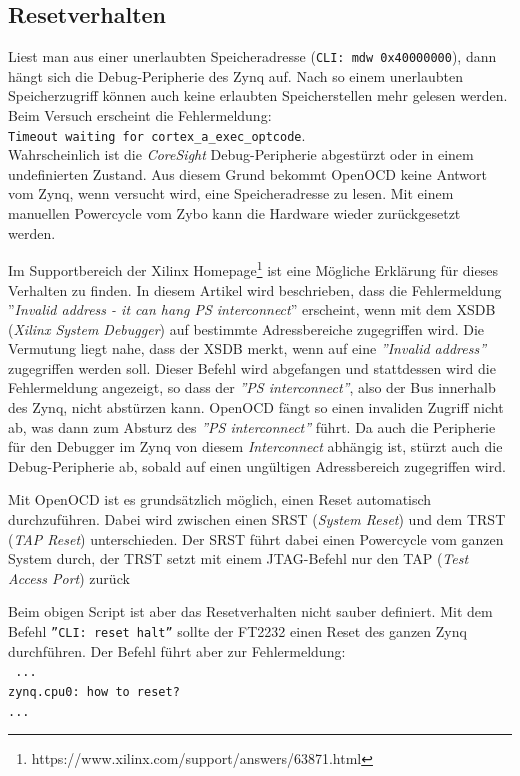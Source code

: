 \subsection{Resetverhalten}
Liest man aus einer unerlaubten Speicheradresse (\texttt{CLI: mdw 0x40000000}), dann hängt sich die Debug-Peripherie des Zynq auf.
Nach so einem unerlaubten Speicherzugriff können auch keine erlaubten Speicherstellen mehr gelesen werden.
Beim Versuch erscheint die Fehlermeldung:\\
\texttt{Timeout waiting for cortex\_a\_exec\_optcode}.\\
Wahrscheinlich ist die \textit{CoreSight} Debug-Peripherie abgestürzt oder in einem undefinierten Zustand.
Aus diesem Grund bekommt OpenOCD keine Antwort vom Zynq, wenn versucht wird, eine Speicheradresse zu lesen.
Mit einem manuellen Powercycle vom Zybo kann die Hardware wieder zurückgesetzt werden.

Im Supportbereich der Xilinx Homepage\footnote{https://www.xilinx.com/support/answers/63871.html} ist eine Mögliche Erklärung für dieses Verhalten zu finden.
In diesem Artikel wird beschrieben, dass die Fehlermeldung ''\textit{Invalid address - it can hang PS interconnect}'' erscheint, wenn mit dem XSDB (\textit{Xilinx System Debugger}) auf bestimmte Adressbereiche zugegriffen wird.
Die Vermutung liegt nahe, dass der XSDB merkt, wenn auf eine \textit{''Invalid address''} zugegriffen werden soll.
Dieser Befehl wird abgefangen und stattdessen wird die Fehlermeldung angezeigt, so dass der \textit{''PS interconnect''}, also der Bus innerhalb des Zynq, nicht abstürzen kann.
OpenOCD fängt so einen invaliden Zugriff nicht ab, was dann zum Absturz des \textit{''PS interconnect''} führt.
Da auch die Peripherie für den Debugger im Zynq von diesem \textit{Interconnect} abhängig ist, stürzt auch die Debug-Peripherie ab, sobald auf einen ungültigen Adressbereich zugegriffen wird.

Mit OpenOCD ist es grundsätzlich möglich, einen Reset automatisch durchzuführen.
Dabei wird zwischen einen SRST (\textit{System Reset}) und dem TRST (\textit{TAP Reset}) unterschieden.
Der SRST führt dabei einen Powercycle vom ganzen System durch, der TRST setzt mit einem JTAG-Befehl nur den TAP (\textit{Test Access Port}) zurück

Beim obigen Script ist aber das Resetverhalten nicht sauber definiert.
Mit dem Befehl \texttt{''CLI: reset halt''} sollte der FT2232 einen Reset des ganzen Zynq durchführen.
Der Befehl führt aber zur Fehlermeldung:\\
\texttt{
...\\
zynq.cpu0: how to reset?\\
...
}

